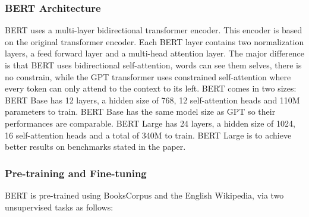 \documentclass[11pt, a4paper]{amsart}
\begin{document}
\subsubsection {BERT Architecture}

BERT uses a multi-layer bidirectional transformer encoder. 
This encoder is based on the original transformer encoder. 
Each BERT layer contains two normalization layers, a feed forward layer and a multi-head attention layer. 
The major difference is that BERT uses bidirectional self-attention, words can see them selves, there is no constrain, while the GPT transformer uses constrained self-attention where every token can only attend to the context to its left. 
BERT comes in two sizes:
BERT Base has 12 layers, a hidden size of 768, 12 self-attention heads and 110M parameters to train. 
BERT Base has the same model size as GPT so their performances are comparable. 
BERT Large has 24 layers, a hidden size of 1024, 16 self-attention heads and a total of 340M to train. 
BERT Large is to achieve better results on benchmarks stated in the paper.

\subsubsection{Pre-training and Fine-tuning}

BERT is pre-trained using BooksCorpus and the English Wikipedia, via two unsupervised tasks as follows:
\end{document}
